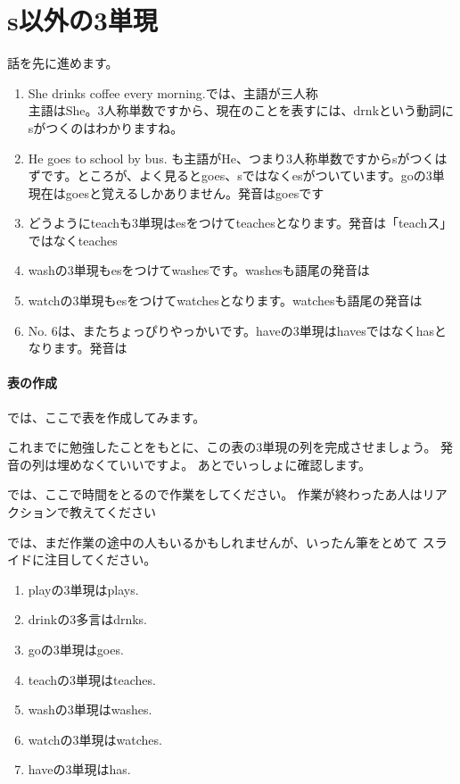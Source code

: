 \documentclass[book,jafontscale=0.9247]{jlreq}
\let\textipa\relax
\newcommand{\mySagyo}{%
\par%
\bigskip
では、ここで時間をとるので作業をしてください。
作業が終わったあ人はリアクションで教えてください\par%
\begin{minipage}[t]{.98\textwidth}
\mbox{}\hrulefill\mbox{}\par%
\mbox{}\hfill{}\raisebox{-.5\height}{作業}\hfill\mbox{}\par%
\mbox{}\hrulefill\mbox{}
\end{minipage}%
\par%
\bigskip%
では、まだ作業の途中の人もいるかもしれませんが、いったん筆をとめて
スライドに注目してください。%
\par%
\bigskip
}
\begin{document}
\newpage
\section{s以外の3単現}

話を先に進めます。

\begin{enumerate}
 \item She drinks coffee every morning.では、主語が三人称\\
主語はShe。3人称単数ですから、現在のことを表すには、drnkという動詞にsがつくのはわかりますね。
 \item He goes to school by bus. も主語がHe、つまり3人称単数ですからsがつくはずです。ところが、よく見るとgoes、sではなくesがついています。goの3単現在はgoesと覚えるしかありません。発音はgoesです
 \item どうようにteachも3単現はesをつけてteachesとなります。発音は「teachス」ではなくteaches\textipa{/iz/}
 \item washの3単現もesをつけてwashesです。washesも語尾の発音は\textipa{/iz}
 \item watchの3単現もesをつけてwatchesとなります。watchesも語尾の発音は\textipa{/iz}
 \item No. 6は、またちょっぴりやっかいです。haveの3単現はhavesではなくhasとなります。発音は\textipa{/z/}
\end{enumerate}

\paragraph{表の作成}

では、ここで表を作成してみます。

これまでに勉強したことをもとに、この表の3単現の列を完成させましょう。
発音の列は埋めなくていいですよ。
あとでいっしょに確認します。

\mySagyo

\begin{enumerate}
 \item playの3単現はplays.
 \item drinkの3多言はdrnks.
 \item goの3単現はgoes.
 \item teachの3単現はteaches.
 \item washの3単現はwashes.
 \item watchの3単現はwatches.
 \item haveの3単現はhas.
\end{enumerate}
\end{document}
